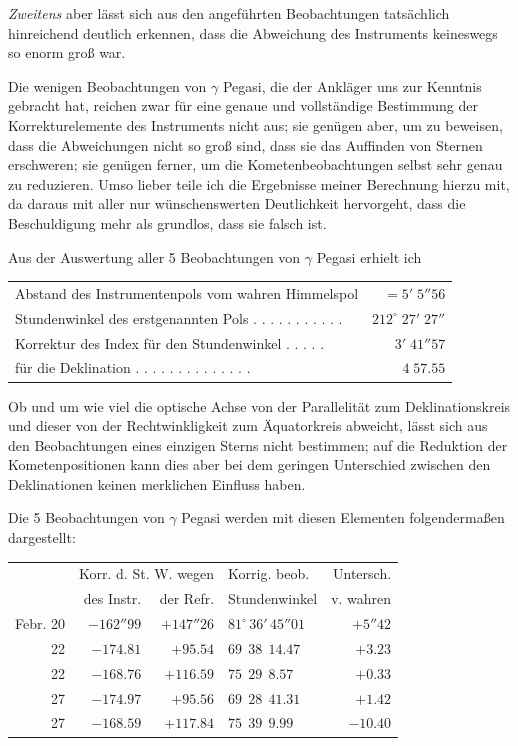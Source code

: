 \emph{Zweitens} aber lässt sich aus den angeführten Beobachtungen tatsächlich hinreichend deutlich erkennen, dass die Abweichung des Instruments keineswegs so enorm groß war.

Die wenigen Beobachtungen von $\gamma$ Pegasi, die der Ankläger uns zur Kenntnis gebracht hat, reichen zwar für eine genaue und vollständige Bestimmung der Korrekturelemente des Instruments nicht aus; sie genügen aber, um zu beweisen, dass die Abweichungen nicht so groß sind, dass sie das Auffinden von Sternen erschweren; sie genügen ferner, um die Kometenbeobachtungen selbst sehr genau zu reduzieren. Umso lieber teile ich die Ergebnisse meiner Berechnung hierzu mit, da daraus mit aller nur wünschenswerten Deutlichkeit hervorgeht, dass die Beschuldigung mehr als grundlos, dass sie falsch ist.

Aus der Auswertung aller 5 Beobachtungen von $\gamma$ Pegasi erhielt ich
\begin{center}\footnotesize\setlength{\tabcolsep}{3pt}
\begin{tabular}{@{}l r@{}}
Abstand des Instrumentenpols vom wahren Himmelspol & $=5'\;5''56$\\
Stundenwinkel des erstgenannten Pols . . . . . . . . . . . & $212^\circ\;27'\;27''$\\
Korrektur des Index für den Stundenwinkel . . . . . & $3'\;41''57$\\
für die Deklination . . . . . . . . . . . . . . & $4\;57.55$
\end{tabular}\end{center}

Ob und um wie viel die optische Achse von der Parallelität zum Deklinationskreis und dieser von der Rechtwinkligkeit zum Äquatorkreis abweicht, lässt sich aus den Beobachtungen eines einzigen Sterns nicht  bestimmen; auf die Reduktion der Kometenpositionen kann dies aber bei dem geringen Unterschied zwischen den Deklinationen keinen merklichen Einfluss haben.

Die 5 Beobachtungen von $\gamma$ Pegasi werden mit diesen Elementen folgendermaßen
dargestellt:

\begin{center}\footnotesize\setlength{\tabcolsep}{4pt}
\begin{tabular}{r|r|r|l|r}
 & \multicolumn{2}{c|}{Korr. d. St. W. wegen} & Korrig. beob. & Untersch.\\
 & des Instr. & der Refr. & Stundenwinkel & v. wahren \\
\hline
Febr. 20 & $-162''99$ & $+147''26$ & $81^\circ\,36'\,45''01$ & $+5''42$ \\
22 & $-174.81$ & $+95.54$ & $69\ \ 38\ \ 14.47$ & $+3.23$ \\
22 & $-168.76$ & $+116.59$ & $75\ \ 29\ \ 8.57$ & $+0.33$ \\
27 & $-174.97$ & $+95.56$ & $69\ \ 28\ \ 41.31$ & $+1.42$ \\
27 & $-168.59$ & $+117.84$ & $75\ \ 39\ \ 9.99$ & $-10.40$ \\
\end{tabular}
\end{center}

